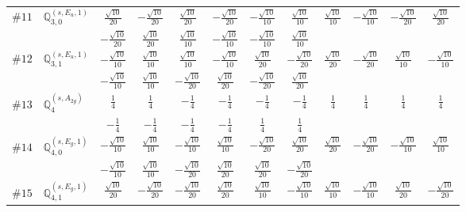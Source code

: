 \documentclass[fleqn,9pt,landscape]{jsarticle}
\begin{document}
\begin{center}
\begin{longtable}{lcccccccccc}
$ \#11\quad \mathbb{Q}_{3,0}^{(s,E_{u},1)} $ & $ \frac{\sqrt{10}}{20} $ & $ - \frac{\sqrt{10}}{20} $ & $ \frac{\sqrt{10}}{20} $ & $ - \frac{\sqrt{10}}{20} $ & $ - \frac{\sqrt{10}}{10} $ & $ \frac{\sqrt{10}}{10} $ & $ \frac{\sqrt{10}}{10} $ & $ - \frac{\sqrt{10}}{10} $ & $ - \frac{\sqrt{10}}{20} $ & $ \frac{\sqrt{10}}{20} $ \\
& $ - \frac{\sqrt{10}}{20} $ & $ \frac{\sqrt{10}}{20} $ & $ \frac{\sqrt{10}}{10} $ & $ - \frac{\sqrt{10}}{10} $ & $ - \frac{\sqrt{10}}{10} $ & $ \frac{\sqrt{10}}{10} $ & $  $ & $  $ & $  $ & $  $ \\ \hline
$ \#12\quad \mathbb{Q}_{3,1}^{(s,E_{u},1)} $ & $ - \frac{\sqrt{10}}{10} $ & $ \frac{\sqrt{10}}{10} $ & $ \frac{\sqrt{10}}{10} $ & $ - \frac{\sqrt{10}}{10} $ & $ \frac{\sqrt{10}}{20} $ & $ - \frac{\sqrt{10}}{20} $ & $ \frac{\sqrt{10}}{20} $ & $ - \frac{\sqrt{10}}{20} $ & $ \frac{\sqrt{10}}{10} $ & $ - \frac{\sqrt{10}}{10} $ \\
& $ - \frac{\sqrt{10}}{10} $ & $ \frac{\sqrt{10}}{10} $ & $ - \frac{\sqrt{10}}{20} $ & $ \frac{\sqrt{10}}{20} $ & $ - \frac{\sqrt{10}}{20} $ & $ \frac{\sqrt{10}}{20} $ & $  $ & $  $ & $  $ & $  $ \\ \hline
$ \#13\quad \mathbb{Q}_{4}^{(s,A_{2g})} $ & $ \frac{1}{4} $ & $ \frac{1}{4} $ & $ - \frac{1}{4} $ & $ - \frac{1}{4} $ & $ - \frac{1}{4} $ & $ - \frac{1}{4} $ & $ \frac{1}{4} $ & $ \frac{1}{4} $ & $ \frac{1}{4} $ & $ \frac{1}{4} $ \\
& $ - \frac{1}{4} $ & $ - \frac{1}{4} $ & $ - \frac{1}{4} $ & $ - \frac{1}{4} $ & $ \frac{1}{4} $ & $ \frac{1}{4} $ & $  $ & $  $ & $  $ & $  $ \\ \hline
$ \#14\quad \mathbb{Q}_{4,0}^{(s,E_{g},1)} $ & $ - \frac{\sqrt{10}}{10} $ & $ \frac{\sqrt{10}}{10} $ & $ - \frac{\sqrt{10}}{10} $ & $ \frac{\sqrt{10}}{10} $ & $ - \frac{\sqrt{10}}{20} $ & $ \frac{\sqrt{10}}{20} $ & $ \frac{\sqrt{10}}{20} $ & $ - \frac{\sqrt{10}}{20} $ & $ - \frac{\sqrt{10}}{10} $ & $ \frac{\sqrt{10}}{10} $ \\
& $ - \frac{\sqrt{10}}{10} $ & $ \frac{\sqrt{10}}{10} $ & $ - \frac{\sqrt{10}}{20} $ & $ \frac{\sqrt{10}}{20} $ & $ \frac{\sqrt{10}}{20} $ & $ - \frac{\sqrt{10}}{20} $ & $  $ & $  $ & $  $ & $  $ \\ \hline
$ \#15\quad \mathbb{Q}_{4,1}^{(s,E_{g},1)} $ & $ \frac{\sqrt{10}}{20} $ & $ - \frac{\sqrt{10}}{20} $ & $ - \frac{\sqrt{10}}{20} $ & $ \frac{\sqrt{10}}{20} $ & $ \frac{\sqrt{10}}{10} $ & $ - \frac{\sqrt{10}}{10} $ & $ \frac{\sqrt{10}}{10} $ & $ - \frac{\sqrt{10}}{10} $ & $ \frac{\sqrt{10}}{20} $ & $ - \frac{\sqrt{10}}{20} $ \\

\end{longtable}
\end{center}
\end{document}
